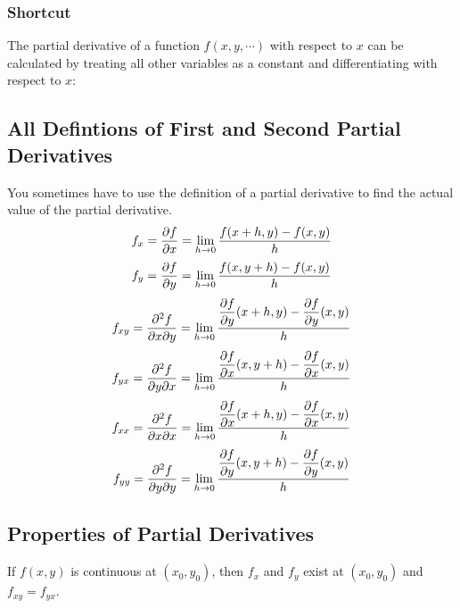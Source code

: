 \subsubsection{Shortcut}
The partial derivative of a function \(f(x, y, \cdots)\) with respect to \(x\) can be calculated by treating all other variables as a constant and differentiating with respect to \(x\):

\subsection{All Defintions of First and Second Partial Derivatives}
You sometimes have to use the definition of a partial derivative to find the actual value of the partial derivative. 
\begin{equation} \label{Partial Derivative f_x Definition}
    f_x = \dfrac{\partial f}{\partial x} = \lim_{h \to 0} \dfrac{f(x+h, y) - f(x, y)}{h}
\end{equation}
\begin{equation}\label{Partial Derivative f_y Definition}
    f_y = \dfrac{\partial f}{\partial y} = \lim_{h \to 0} \dfrac{f(x, y+h) - f(x, y)}{h}
\end{equation}
\begin{equation}\label{Second Partial Derivative f_xx Definition}
    f_{xy} = \dfrac{\partial^2 f}{\partial x \partial y} = \lim_{h \to 0} \dfrac{\dfrac{\partial f}{\partial y}(x+h, y) - \dfrac{\partial f}{\partial y}(x, y)}{h}
\end{equation}
\begin{equation}\label{Second Partial Derivative f_yx Definition}
    f_{yx} = \dfrac{\partial^2 f}{\partial y \partial x} = \lim_{h \to 0} \dfrac{\dfrac{\partial f}{\partial x}(x, y+h) - \dfrac{\partial f}{\partial x}(x, y)}{h}
\end{equation}
\begin{equation}\label{Second Partial Derivative f_xx Definition}
    f_{xx} = \dfrac{\partial^2 f}{\partial x \partial x} = \lim_{h \to 0} \dfrac{\dfrac{\partial f}{\partial x}(x+h, y) - \dfrac{\partial f}{\partial x}(x, y)}{h}
\end{equation}
\begin{equation}\label{Second Partial Derivative f_yy Definition}
    f_{yy} = \dfrac{\partial^2 f}{\partial y \partial y} = \lim_{h \to 0} \dfrac{\dfrac{\partial f}{\partial y}(x, y+h) - \dfrac{\partial f}{\partial y}(x, y)}{h}
\end{equation}

\subsection{Properties of Partial Derivatives}
If $f(x,y)$ is continuous at $(x_0, y_0)$, then $f_x$ and $f_y$ exist at $(x_0, y_0)$ and $f_{xy} = f_{yx}$.


